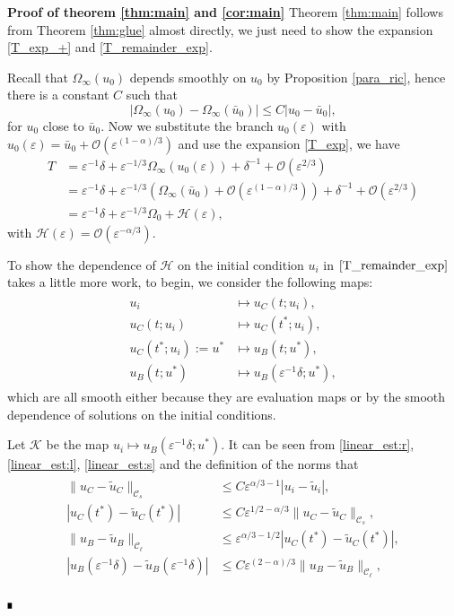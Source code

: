 \documentclass[letterpaper,11pt]{article}
\newcommand{\rmO}{\mathcal{O}}
\newcommand{\eps}{\varepsilon}
\numberwithin{equation}{section}
\theoremstyle{plain}
\newenvironment{Proof}[1][.]%
 {\begin{trivlist}\item[]\textbf{Proof#1 }}%
 {\hspace*{\fill}$\rule{0.3\baselineskip}{0.35\baselineskip}$\end{trivlist}}
\begin{document}
\begin{Proof}[\textbf{ of theorem \ref{thm:main} and \ref{cor:main}}]
Theorem \ref{thm:main} follows from Theorem \ref{thm:glue} almost directly, we just need to show the expansion \eqref{T_exp_+} and \eqref{T_remainder_exp}. 

Recall that $\Omega_\infty(u_0)$ depends smoothly on $u_0$ by Proposition \ref{para_ric}, hence there is a constant $C$ such that
\[
|\Omega_\infty(u_0) - \Omega_\infty(\bar{u}_0)| \le C|u_0 - \bar{u}_0|,
\]
for $u_0$ close to $\bar{u}_0$. Now we substitute the branch $u_0(\eps)$ with $u_0(\eps)  =\bar{u}_0 + \rmO(\eps^{(1-\alpha)/3})$ and use the expansion \eqref{T_exp}, we have
\begin{align*}
T &= \eps^{-1}\delta + \eps^{-1/3}\Omega_\infty(u_0(\eps)) + \delta^{-1} + \rmO(\eps^{2/3})\\
&= \eps^{-1}\delta + \eps^{-1/3}(\Omega_\infty(\bar{u}_0) + \rmO(\eps^{(1-\alpha)/3}))+\delta^{-1} + \rmO(\eps^{2/3}) \\
&= \eps^{-1}\delta + \eps^{-1/3}\Omega_0 + \mathcal{H}(\eps),
\end{align*}
with $\mathcal{H}(\eps) = \rmO(\eps^{-\alpha/3})$.

To show the dependence of $\mathcal{H}$ on the initial condition $u_i$ in $\eqref{T_remainder_exp}$ takes a little more work, to begin, we consider the following maps:
\begin{align*}
\begin{split}
u_i &\mapsto u_C(t;u_i),\\
u_C(t;u_i) &\mapsto u_C(t^*; u_i), \\
u_C(t^*; u_i):= u^* &\mapsto u_B(t; u^*), \\
u_B(t;u^*) &\mapsto u_B(\eps^{-1}\delta ; u^*),
\end{split}
\end{align*}
which are all smooth either because they are evaluation maps or by the smooth dependence of solutions on the initial conditions.

Let $\mathcal{K}$ be the map $u_i\mapsto u_B(\eps^{-1}\delta;u^*)$. It can be seen from \eqref{linear_est:r},\eqref{linear_est:l}, \eqref{linear_est:s} and the definition of the norms that
\begin{align*}
\begin{split}
\|u_C - \tilde{u}_C\|_{\mathcal{C}_s} &\le C\eps^{\alpha/3-1}|u_i -\tilde{u}_i| ,\\
|u_C(t^*) - \tilde{u}_C(t^*)| &\le C\eps^{1/2-\alpha/3}\|u_C - \tilde{u}_C\|_{\mathcal{C}_s}, \\
\|u_B - \tilde{u}_B\|_{\mathcal{C}_\ell} &\le \eps^{\alpha/3-1/2}|u_C(t^*) - \tilde{u}_C(t^*)|, \\
|u_B(\eps^{-1}\delta)-\tilde{u}_B(\eps^{-1}\delta)| &\le C\eps^{(2-\alpha)/3}\|u_B - \tilde{u}_B\|_{\mathcal{C}_\ell},
\end{split}
\end{align*}


\end{Proof}
\end{document}

